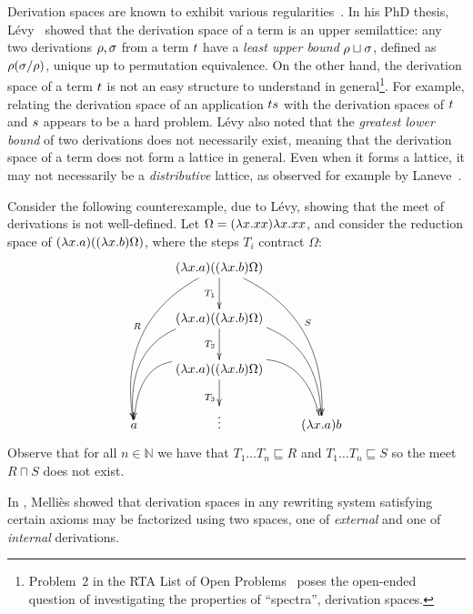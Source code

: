 Derivation spaces are known to exhibit various
regularities~\cite{Tesis:Levy:1978,DBLP:journals/tcs/Zilli84,laneve1994distributive,thesismellies,levy_redex_stability,DBLP:conf/lics/AspertiL13}.
In his PhD thesis, L\'evy~\cite{Tesis:Levy:1978} showed that the derivation space of a term is
an upper semilattice: any two derivations $\rho,\sigma$ from a term $t$
have a {\em least upper bound} $\rho \sqcup \sigma$, defined as $\rho(\sigma/\rho)$,
unique up to permutation equivalence.
On the other hand, the derivation space of a term $t$ is not an easy structure to understand in general\footnote{Problem~2 in
the RTA List of Open Problems~\cite{dershowitz1991open} poses
the open-ended question of investigating the properties of ``spectra'', \ie derivation spaces.}.
For example, relating the derivation space of an application $ts$
with the derivation spaces of $t$ and $s$ appears to be a hard problem.
L\'evy also noted that the {\em greatest lower bound} of two derivations does
not necessarily exist, meaning that the derivation space of a term does not form a lattice in general.
Even when it forms a lattice, it may not necessarily be a {\em distributive} lattice, as observed for example by
Laneve~\cite{laneve1994distributive}.

Consider the following counterexample,
due to L\'evy, showing that the meet of derivations is not well-defined.
Let $\Omega = (\lambda x. xx)\lambda x. xx$,
and consider the reduction space of $(\lambda x. a)((\lambda x. b)\Omega)$,
where the steps $T_i$ contract $\Omega$:
\[
  \xymatrix{
    &
    (\lam{\var}{a})((\lam{\var}{b})\Omega)
    \ar_{T_1}[d]
    \ar@/_1cm/_{R}[dddl]
    \ar@/^1cm/^{S}[dddr]
    &
  \\
    &
    (\lam{\var}{a})((\lam{\var}{b})\Omega)
    \ar@/_1cm/[ddl] \ar@/^1cm/[ddr]
    \ar_{T_2}[d]
    &
  \\
    &
    (\lam{\var}{a})((\lam{\var}{b})\Omega)
    \ar@/_1cm/[dl] \ar@/^1cm/[dr]
    \ar_{T_3}[d]
    &
  \\
    a
    &
    \vdots
    &
    (\lam{\var}{a})b
  }
\]
Observe that for all $n \in \mathbb{N}$ we have that $T_1 \hdots T_n \sqsubseteq R$
and $T_1 \hdots T_n \sqsubseteq S$ so the meet $R \sqcap S$ does not exist.


In \cite{DBLP:conf/ctcs/Mellies97}, Melli\`es showed that
derivation spaces in any rewriting system satisfying certain axioms
may be factorized using two spaces,
one of {\em external} and one of {\em internal} derivations.



